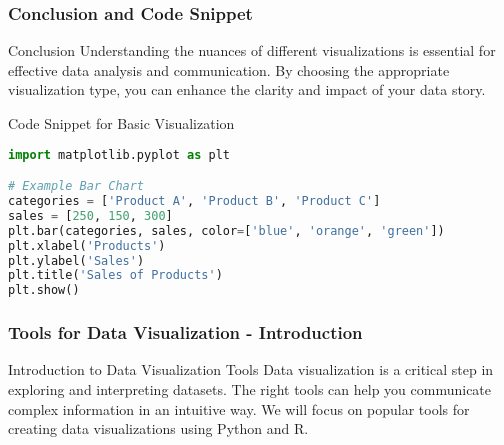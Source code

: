 \documentclass[aspectratio=169]{beamer}
\begin{document}
\begin{frame}[fragile]
    \frametitle{Conclusion and Code Snippet}
    \begin{block}{Conclusion}
        Understanding the nuances of different visualizations is essential for effective data analysis and communication. By choosing the appropriate visualization type, you can enhance the clarity and impact of your data story.
    \end{block}

    \begin{block}{Code Snippet for Basic Visualization}
    \begin{lstlisting}[language=Python]
import matplotlib.pyplot as plt

# Example Bar Chart
categories = ['Product A', 'Product B', 'Product C']
sales = [250, 150, 300]
plt.bar(categories, sales, color=['blue', 'orange', 'green'])
plt.xlabel('Products')
plt.ylabel('Sales')
plt.title('Sales of Products')
plt.show()
    \end{lstlisting}
    \end{block}
\end{frame}

\begin{frame}[fragile]
    \frametitle{Tools for Data Visualization - Introduction}
    \begin{block}{Introduction to Data Visualization Tools}
        Data visualization is a critical step in exploring and interpreting datasets. 
        The right tools can help you communicate complex information in an intuitive way. 
        We will focus on popular tools for creating data visualizations using Python and R.
    \end{block}
\end{frame}
\end{document}
